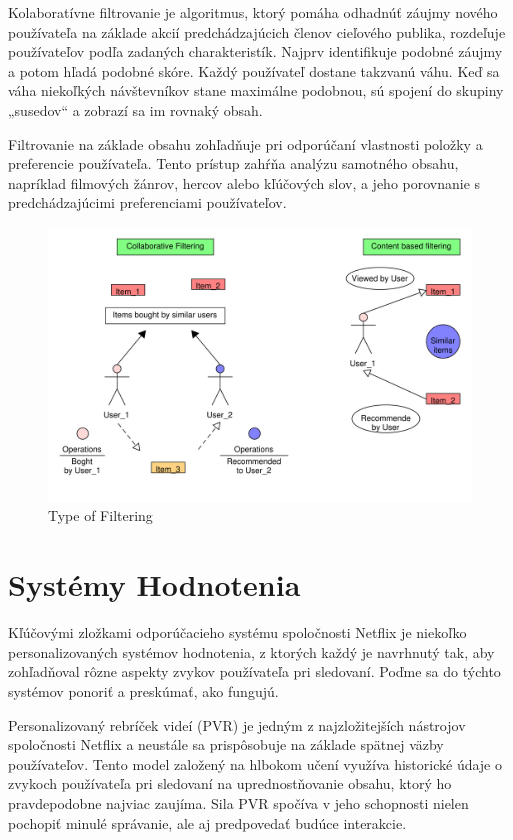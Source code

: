 \documentclass[10pt,slovak,a4paper]{article}
\begin{document}
Kolaboratívne filtrovanie je algoritmus, ktorý pomáha odhadnúť záujmy nového používateľa na základe akcií predchádzajúcich členov cieľového publika, rozdeľuje používateľov podľa zadaných charakteristík. Najprv identifikuje podobné záujmy a potom hľadá podobné skóre. Každý používateľ dostane takzvanú váhu. Keď sa váha niekoľkých návštevníkov stane maximálne podobnou, sú spojení do skupiny „susedov“ a zobrazí sa im rovnaký obsah.\cite{Collaborative:Filtering}

Filtrovanie na základe obsahu zohľadňuje pri odporúčaní vlastnosti položky a preferencie používateľa. Tento prístup zahŕňa analýzu samotného obsahu, napríklad filmových žánrov, hercov alebo kľúčových slov, a jeho porovnanie s predchádzajúcimi preferenciami používateľov.\cite{Linkedin}



\begin{figure}[h!]
  \centering
  \includegraphics[width=1\textwidth]{Images/Filtering_pdf.pdf} %
  \caption{Type of Filtering}
\end{figure}

\section{Systémy Hodnotenia}
 Kľúčovými zložkami odporúčacieho systému spoločnosti Netflix je niekoľko personalizovaných systémov hodnotenia, z ktorých každý je navrhnutý tak, aby zohľadňoval rôzne aspekty zvykov používateľa pri sledovaní. Poďme sa do týchto systémov ponoriť a preskúmať, ako fungujú.

Personalizovaný rebríček videí (PVR) je jedným z najzložitejších nástrojov spoločnosti Netflix a neustále sa prispôsobuje na základe spätnej väzby používateľov. Tento model založený na hlbokom učení využíva historické údaje o zvykoch používateľa pri sledovaní na uprednostňovanie obsahu, ktorý ho pravdepodobne najviac zaujíma. Sila PVR spočíva v jeho schopnosti nielen pochopiť minulé správanie, ale aj predpovedať budúce interakcie.\cite{Argoid}\cite{Data}
\end{document}
